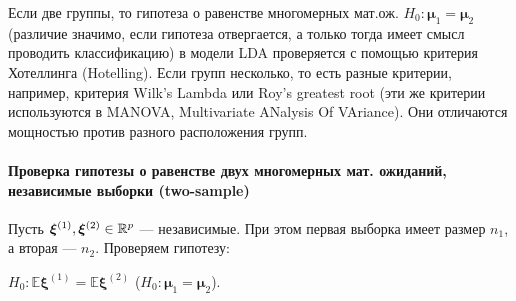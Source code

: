 \begin{note}
  Если две группы, то гипотеза о равенстве многомерных мат.ож. $H_0: \bm{\mu}_1 = \bm{\mu}_2$ (различие значимо, если гипотеза отвергается, а только тогда имеет смысл проводить классификацию) в модели LDA проверяется с помощью критерия Хотеллинга (Hotelling). Если групп несколько, то есть разные критерии, например, критерия Wilk's Lambda или Roy's greatest root (эти же критерии используются в MANOVA, Multivariate ANalysis Of VAriance). Они отличаются мощностью против разного расположения групп.
\end{note}

\paragraph{Проверка гипотезы о равенстве двух многомерных мат. ожиданий, независимые выборки (two-sample)}
Пусть $\bm\xi^{(1)},\bm\xi^{(2)} \in \mathbb{R}^p$  --- независимые. При этом первая выборка имеет размер $n_1$, а вторая --- $n_2$. Проверяем гипотезу:

$H_0: \mathbb{E}\bm\xi^{(1)} = \mathbb{E}\bm\xi^{(2)}$ ($H_0: \bm\mu_1 = \bm\mu_2$).

